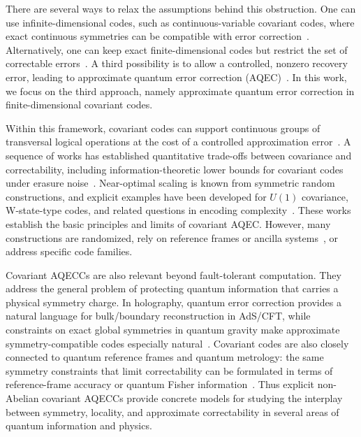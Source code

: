 \documentclass[10pt,twocolumn,superscriptaddress,aps,amsmath,amssymb,citeautoscript,floatfix,prx]{revtex4-2}
\theoremstyle{plain}
\theoremstyle{plain}
\theoremstyle{plain}
\theoremstyle{plain}
\theoremstyle{plain}
\theoremstyle{plain}
\begin{document}
There are several ways to relax the assumptions behind this obstruction. One can use infinite-dimensional codes, such as continuous-variable covariant codes, where exact continuous symmetries can be compatible with error correction~\cite{Hayden2021}. Alternatively, one can keep exact finite-dimensional codes but restrict the set of correctable errors~\cite{Gupta2024}. A third possibility is to allow a controlled, nonzero recovery error, leading to approximate quantum error correction (AQEC)~\cite{schumacher2002approximate, Beny2010}. In this work, we focus on the third approach, namely approximate quantum error correction in finite-dimensional covariant codes.

Within this framework, covariant codes can support continuous groups of transversal logical operations at the cost of a controlled approximation error~\cite{Faist2020}. A sequence of works has established quantitative trade-offs between covariance and correctability, including information-theoretic lower bounds for covariant codes under erasure noise~\cite{Faist2020,Zhou2021,Faist2023,Kong2022,Yang2022}. Near-optimal scaling is known from symmetric random constructions, and explicit examples have been developed for $U(1)$ covariance, W-state-type codes, and related questions in encoding complexity~\cite{Lin2025,Faist2020,Alexander2025,Yi2024}. These works establish the basic principles and limits of covariant AQEC. However, many constructions are randomized, rely on reference frames or ancilla systems~\cite{Kong2022,Yang2022}, or address specific code families. 

Covariant AQECCs are also relevant beyond fault-tolerant computation. They address the general problem of protecting quantum information that carries a physical symmetry charge. In holography, quantum error correction provides a natural language for bulk/boundary reconstruction in AdS/CFT, while constraints on exact global symmetries in quantum gravity make approximate symmetry-compatible codes especially natural~\cite{Almheiri2015,Pastawski2015,HarlowOoguri2019}. Covariant codes are also closely connected to quantum reference frames and quantum metrology: the same symmetry constraints that limit correctability can be formulated in terms of reference-frame accuracy or quantum Fisher information~\cite{Hayden2021,Woods2020,Kubica2021}. Thus explicit non-Abelian covariant AQECCs provide concrete models for studying the interplay between symmetry, locality, and approximate correctability in several areas of quantum information and physics.
\end{document}
